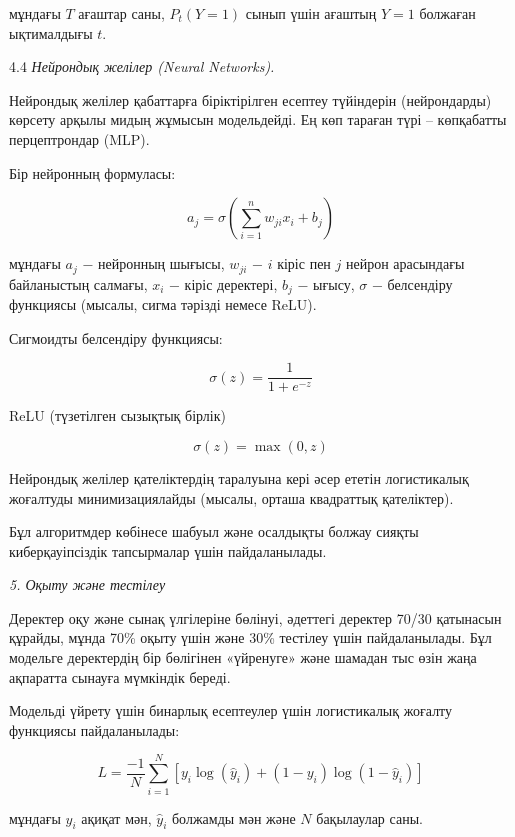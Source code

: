 мұндағы \(T\) ағаштар саны, \(P_{t}(Y = 1)\) сынып үшін ағаштың
\(Y = 1\) болжаған ықтималдығы \(t\).

4.4 \emph{Нейрондық желілер (Neural Networks).}

Нейрондық желілер қабаттарға біріктірілген есептеу түйіндерін
(нейрондарды) көрсету арқылы мидың жұмысын модельдейді. Ең көп тараған
түрі -- көпқабатты перцептрондар (MLP).

Бір нейронның формуласы:

\begin{equation}
a_{j} = \sigma\left( \sum_{i = 1}^{n}{w_{ji}x_{i} + b_{j}} \right)
\end{equation}

мұндағы \(a_{j}\) − нейронның шығысы, \(w_{ji}\) − \(i\) кіріс пен \(j\)
нейрон арасындағы байланыстың салмағы, \(x_{i}\) − кіріс деректері,
\(b_{j}\) − ығысу, \(\sigma\) − белсендіру функциясы (мысалы, сигма
тәрізді немесе ReLU).

Сигмоидты белсендіру функциясы:

\begin{equation}
\sigma(z) = \frac{1}{1 + e^{- z}}
\end{equation}

ReLU (түзетілген сызықтық бірлік)

\begin{equation}
\sigma(z) = \max(0,z)
\end{equation}

Нейрондық желілер қателіктердің таралуына кері әсер ететін логистикалық
жоғалтуды минимизациялайды (мысалы, орташа квадраттық қателіктер).

Бұл алгоритмдер көбінесе шабуыл және осалдықты болжау сияқты
киберқауіпсіздік тапсырмалар үшін пайдаланылады.

\emph{5. Оқыту және тестілеу}

Деректер оқу және сынақ үлгілеріне бөлінуі, әдеттегі деректер 70/30
қатынасын құрайды, мұнда 70\% оқыту үшін және 30\% тестілеу үшін
пайдаланылады. Бұл модельге деректердің бір бөлігінен «үйренуге» және
шамадан тыс өзін жаңа ақпаратта сынауға мүмкіндік береді.

Модельді үйрету үшін бинарлық есептеулер үшін логистикалық жоғалту
функциясы пайдаланылады:

\[L = \frac{- 1}{N}\sum_{i = 1}^{N}\left\lbrack y_{i}\log\left( {\hat{y}}_{i} \right) + (1 - y_{i})\log(1 - {\hat{y}}_{i}) \right\rbrack\]

мұндағы \(y_{i}\) ақиқат мән, \({\hat{y}}_{i}\) болжамды мән және \(N\)
бақылаулар саны.

